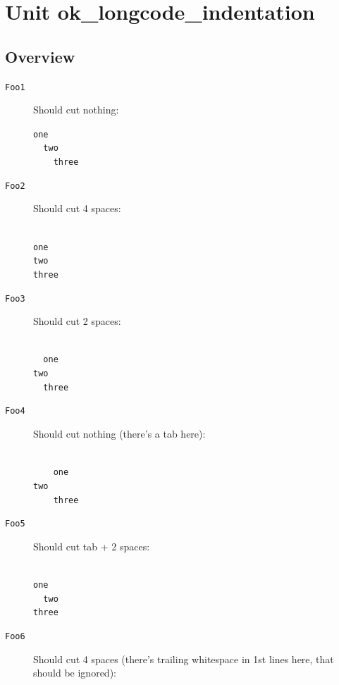 \documentclass{report}
\begin{document}
\label{toc}\tableofcontents
\newpage
\newlength{\tmplength}
\chapter{Unit ok{\_}longcode{\_}indentation}
\label{ok_longcode_indentation}
\section{Overview}
\begin{description}
\item[\texttt{Foo1}]Should cut nothing:

\texttt{one\\\nopagebreak[3]
~~two\\\nopagebreak[3]
~~~~three\\
}
\item[\texttt{Foo2}]Should cut 4 spaces:

\texttt{\\\nopagebreak[3]
one\\\nopagebreak[3]
two\\\nopagebreak[3]
three\\
}
\item[\texttt{Foo3}]Should cut 2 spaces:

\texttt{\\\nopagebreak[3]
~~one\\\nopagebreak[3]
two\\\nopagebreak[3]
~~three\\
}
\item[\texttt{Foo4}]Should cut nothing (there's a tab here):

\texttt{\\\nopagebreak[3]
~~~~one\\\nopagebreak[3]
	two\\\nopagebreak[3]
~~~~three\\
}
\item[\texttt{Foo5}]Should cut tab + 2 spaces:

\texttt{\\\nopagebreak[3]
one\\\nopagebreak[3]
~~two\\\nopagebreak[3]
three\\
}
\item[\texttt{Foo6}]Should cut 4 spaces (there's trailing whitespace in 1st lines here, that should be ignored):


\end{description}
\end{document}
